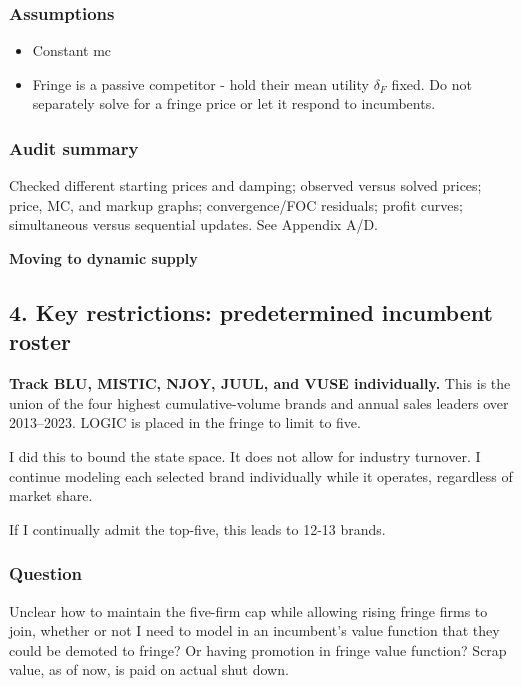 \documentclass[11pt,]{article}
\providecommand{\tightlist}{%
  \setlength{\itemsep}{0pt}\setlength{\parskip}{0pt}}
\begin{document}
\subsubsection{Assumptions}\label{assumptions}

\begin{itemize}
\tightlist
\item
  Constant mc
\item
  Fringe is a passive competitor - hold their mean utility \(\delta_F\)
  fixed. Do not separately solve for a fringe price or let it respond to
  incumbents.
\end{itemize}

\subsubsection{Audit summary}\label{audit-summary}

Checked different starting prices and damping; observed versus solved
prices; price, MC, and markup graphs; convergence/FOC residuals; profit
curves; simultaneous versus sequential updates. See Appendix A/D.

\clearpage

\textbf{Moving to dynamic supply}

\subsection{4. Key restrictions: predetermined incumbent
roster}\label{key-restrictions-predetermined-incumbent-roster}

\textbf{Track BLU, MISTIC, NJOY, JUUL, and VUSE individually.} This is
the union of the four highest cumulative-volume brands and annual sales
leaders over 2013--2023. LOGIC is placed in the fringe to limit to five.

I did this to bound the state space. It does not allow for industry
turnover. I continue modeling each selected brand individually while it
operates, regardless of market share.

If I continually admit the top-five, this leads to 12-13 brands.

\subsubsection{Question}\label{question}

Unclear how to maintain the five-firm cap while allowing rising fringe
firms to join, whether or not I need to model in an incumbent's value
function that they could be demoted to fringe? Or having promotion in
fringe value function? Scrap value, as of now, is paid on actual shut
down.
\end{document}
